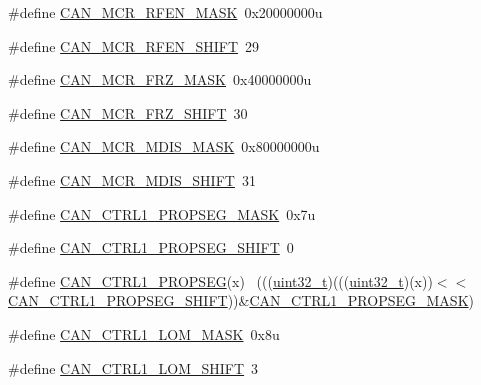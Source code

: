 \begin{DoxyCompactItemize}
\item 
\#define \hyperlink{group___c_a_n___register___masks_ga55cd060ac6cdad670aeb97522a118930}{C\+A\+N\+\_\+\+M\+C\+R\+\_\+\+R\+F\+E\+N\+\_\+\+M\+A\+SK}~0x20000000u
\item 
\#define \hyperlink{group___c_a_n___register___masks_gaffab6b0e09ace8e09cb1487dd6639955}{C\+A\+N\+\_\+\+M\+C\+R\+\_\+\+R\+F\+E\+N\+\_\+\+S\+H\+I\+FT}~29
\item 
\#define \hyperlink{group___c_a_n___register___masks_ga1b55e4024cec7ad30bcba945a70c3383}{C\+A\+N\+\_\+\+M\+C\+R\+\_\+\+F\+R\+Z\+\_\+\+M\+A\+SK}~0x40000000u
\item 
\#define \hyperlink{group___c_a_n___register___masks_gae3aac50a6bba3516d60fd881e8a8b069}{C\+A\+N\+\_\+\+M\+C\+R\+\_\+\+F\+R\+Z\+\_\+\+S\+H\+I\+FT}~30
\item 
\#define \hyperlink{group___c_a_n___register___masks_gaadea43214ec6dcbab21d59988ae401bb}{C\+A\+N\+\_\+\+M\+C\+R\+\_\+\+M\+D\+I\+S\+\_\+\+M\+A\+SK}~0x80000000u
\item 
\#define \hyperlink{group___c_a_n___register___masks_ga15f1bf3b87536155c2b13f279b06ba93}{C\+A\+N\+\_\+\+M\+C\+R\+\_\+\+M\+D\+I\+S\+\_\+\+S\+H\+I\+FT}~31
\item 
\#define \hyperlink{group___c_a_n___register___masks_ga0541429f7e3d35ec374c462a83c3ef49}{C\+A\+N\+\_\+\+C\+T\+R\+L1\+\_\+\+P\+R\+O\+P\+S\+E\+G\+\_\+\+M\+A\+SK}~0x7u
\item 
\#define \hyperlink{group___c_a_n___register___masks_ga7eada40e9f9aafd9d58c38b3a3b295b5}{C\+A\+N\+\_\+\+C\+T\+R\+L1\+\_\+\+P\+R\+O\+P\+S\+E\+G\+\_\+\+S\+H\+I\+FT}~0
\item 
\#define \hyperlink{group___c_a_n___register___masks_ga44e0e76a89da9ed9a1e5d71deb8f3d54}{C\+A\+N\+\_\+\+C\+T\+R\+L1\+\_\+\+P\+R\+O\+P\+S\+EG}(x)                                      ~(((\hyperlink{_p_e___types_8h_a33594304e786b158f3fb30289278f5af}{uint32\+\_\+t})(((\hyperlink{_p_e___types_8h_a33594304e786b158f3fb30289278f5af}{uint32\+\_\+t})(x))$<$$<$\hyperlink{group___c_a_n___register___masks_ga7eada40e9f9aafd9d58c38b3a3b295b5}{C\+A\+N\+\_\+\+C\+T\+R\+L1\+\_\+\+P\+R\+O\+P\+S\+E\+G\+\_\+\+S\+H\+I\+FT}))\&\hyperlink{group___c_a_n___register___masks_ga0541429f7e3d35ec374c462a83c3ef49}{C\+A\+N\+\_\+\+C\+T\+R\+L1\+\_\+\+P\+R\+O\+P\+S\+E\+G\+\_\+\+M\+A\+SK})
\item 
\#define \hyperlink{group___c_a_n___register___masks_gac216e0dd5c6df92a49c15077ca628187}{C\+A\+N\+\_\+\+C\+T\+R\+L1\+\_\+\+L\+O\+M\+\_\+\+M\+A\+SK}~0x8u
\item 
\#define \hyperlink{group___c_a_n___register___masks_gafd8f79e66670cb6df0d70e93795649c6}{C\+A\+N\+\_\+\+C\+T\+R\+L1\+\_\+\+L\+O\+M\+\_\+\+S\+H\+I\+FT}~3
$$
\end{DoxyCompactItemize}
